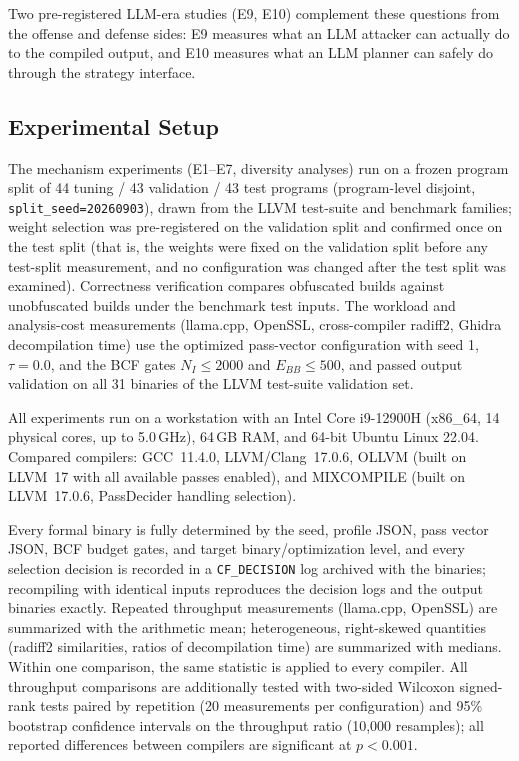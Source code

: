 \documentclass[5p,times,authoryear]{elsarticle}
\theoremstyle{plain}
\theoremstyle{definition}
\theoremstyle{remark}
\begin{document}
Two pre-registered LLM-era studies (E9, E10) complement these questions from
the offense and defense sides: E9 measures what an LLM attacker can actually
do to the compiled output, and E10 measures what an LLM planner can safely do
through the strategy interface.

\subsection{Experimental Setup}
\label{sec:setup}

The mechanism experiments (E1--E7, diversity analyses) run on a frozen program split
of 44 tuning / 43 validation / 43 test programs (program-level disjoint,
\texttt{split\_seed=20260903}), drawn from the LLVM test-suite and benchmark
families; weight selection was pre-registered on the validation split and
confirmed once on the test split (that is, the weights were fixed on the
validation split before any test-split measurement, and no configuration was
changed after the test split was examined). Correctness verification compares obfuscated
builds against unobfuscated builds under the benchmark test inputs. The workload
and analysis-cost measurements (llama.cpp, OpenSSL, cross-compiler radiff2, Ghidra
decompilation time) use the optimized pass-vector configuration with seed 1,
$\tau=0.0$, and the BCF gates $N_I\leq2000$ and $E_{BB}\leq500$, and passed output
validation on all 31 binaries of the LLVM test-suite validation set.

All experiments run on a workstation with an Intel Core i9-12900H (x86\_64, 14
physical cores, up to 5.0\,GHz), 64\,GB RAM, and 64-bit Ubuntu Linux 22.04. Compared
compilers: GCC~11.4.0, LLVM/Clang~17.0.6, OLLVM (built on LLVM~17 with all available
passes enabled), and MIXCOMPILE (built on LLVM~17.0.6, PassDecider handling
selection).

Every formal binary is fully determined by the seed, profile JSON, pass vector
JSON, BCF budget gates, and target binary/optimization level, and every
selection decision is recorded in a \texttt{CF\_DECISION} log archived with
the binaries; recompiling with identical inputs reproduces the decision logs
and the output binaries exactly. Repeated throughput measurements (llama.cpp,
OpenSSL) are summarized with the arithmetic mean; heterogeneous, right-skewed
quantities (radiff2 similarities, ratios of decompilation time) are summarized
with medians. Within one comparison, the same statistic is applied to every
compiler. All throughput comparisons are additionally tested with two-sided
Wilcoxon signed-rank tests paired by repetition (20 measurements per
configuration) and 95\% bootstrap confidence intervals on the throughput
ratio (10{,}000 resamples); all reported differences between compilers are
significant at $p<0.001$.
\end{document}
